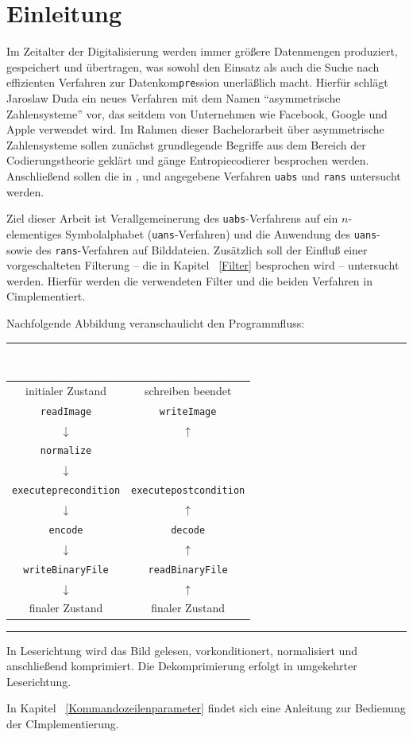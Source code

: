 \documentclass[a4paper,12pt]{article}
\newcommand{\CC}{C\nolinebreak\hspace{-.05em}\raisebox{.4ex}{\tiny\bf+}\nolinebreak\hspace{-.10em}\raisebox{.4ex}{\tiny\bf+}\;}
\begin{document}
\section{Einleitung}
Im Zeitalter der Digitalisierung werden immer größere Datenmengen produziert, gespeichert und übertragen, was sowohl den Einsatz als auch die Suche nach effizienten Verfahren zur Datenkom{\tt{pre}}ssion unerläßlich macht.
Hierfür schlägt Jaroslaw Duda\cite{Duda} ein neues Verfahren mit dem Namen "`asymmetrische Zahlensysteme"' vor, das seitdem von Unternehmen wie Facebook\cite{fb}, Google\cite{google} und Apple\cite{apple} verwendet wird. 
Im Rahmen dieser Bachelorarbeit über asymmetrische Zahlensysteme sollen zunächst grundlegende Begriffe aus dem Bereich der Codierungstheorie geklärt und gänge Entropiecodierer besprochen werden.
Anschließend sollen die in \cite{Giesen}, \cite{Duda} und \cite{Krajcevski} angegebene Verfahren {\tt{uabs}} und {\tt{rans}} untersucht werden.
\par
Ziel dieser Arbeit ist Verallgemeinerung des {\tt{uabs}}-Verfahrens auf ein $n$-elementiges Symbolalphabet ({\tt{uans}}-Verfahren) und die Anwendung des  {\tt{uans}}- sowie des {\tt{rans}}-Verfahren auf Bilddateien. Zusätzlich soll der Einfluß einer vorgeschalteten Filterung -- die in Kapitel ~\ref{Filter} besprochen wird -- untersucht werden. Hierfür werden die verwendeten Filter und die beiden Verfahren in \CC implementiert. 
\par
\vspace{0.5cm}
Nachfolgende Abbildung veranschaulicht den Programmfluss:

\begin{center}
{\color{gray!50!blue}\rule{9cm}{0.1mm}}
\vspace{0.2cm}
\\
\begin{tabular}{c c}
initialer Zustand & schreiben beendet 
\\
{\tt{readImage}} & {\tt{writeImage}}
\\
$\downarrow$ & $\uparrow$ 
\\
{\tt{normalize}} & 
\\
$\downarrow$ & 
\\
{\tt{execute{\tt{pre}}condition}} & {\tt{execute{\tt{post}}condition}}
\\
$\downarrow$ & $\uparrow$ 
\\
{\tt{encode}} & {\tt{decode}}
\\
$\downarrow$ & $\uparrow$ 
\\
{\tt{writeBinaryFile}} & {\tt{readBinaryFile}}
\\
$\downarrow$ & $\uparrow$ 
\\
finaler Zustand & finaler Zustand
\end{tabular}
{\color{gray!50!red}\rule{9cm}{0.1mm}}
\vspace{0.5cm}
\end{center}
In Leserichtung wird das Bild gelesen, vorkonditionert, normalisiert und 
anschließend komprimiert.
Die Dekomprimierung erfolgt in umgekehrter Leserichtung. 
\par
In Kapitel ~\ref{Kommandozeilenparameter} findet sich eine Anleitung zur Bedienung der \CC Implementierung.
\newpage
\end{document}
